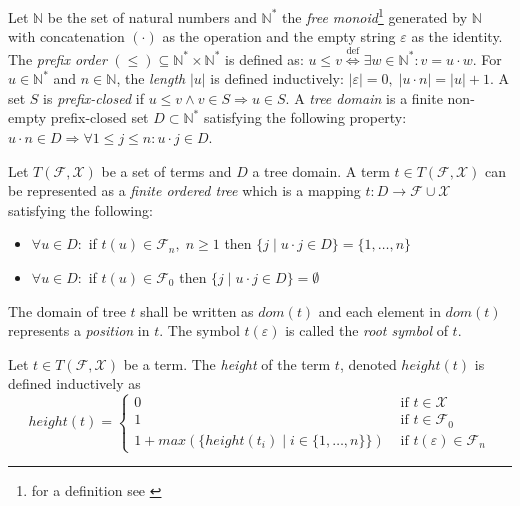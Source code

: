 \begin{defn}
Let $\mathbb{N}$ be the set of natural numbers and $\mathbb{N}^*$ the \emph{free monoid}\footnote{for a definition see \cite{Lothaire83}} generated by $\mathbb{N}$ with concatenation $(\cdot)$ as the operation and the empty string $\varepsilon$ as the identity. The \emph{prefix order} $(\leq) \subseteq \mathbb{N}^* \times \mathbb{N}^*$ is defined as: $u \leq v \overset{\text{def}}{\Longleftrightarrow} \exists w \in \mathbb{N}^*: v = u \cdot w$. For $u \in \mathbb{N}^*$ and $n \in \mathbb{N}$, the \emph{length} $|u|$ is defined inductively: $|\varepsilon| = 0, \; |u \cdot n| = |u| + 1$. A set $S$ is \emph{prefix-closed} if $u \leq v \wedge v \in S \Rightarrow u \in S$. A \emph{tree domain} is a finite non-empty prefix-closed set $D \subset \mathbb{N}^*$ satisfying the following property: $u \cdot n \in D \Rightarrow \forall 1 \leq j \leq n: u \cdot j \in D$.
\end{defn}

\begin{defn}
Let $T(\mathcal{F}, \mathcal{X})$ be a set of terms and $D$ a tree domain. A term $t \in T(\mathcal{F}, \mathcal{X})$ can be represented as a \emph{finite ordered tree} which is a mapping $t: D \rightarrow \mathcal{F} \cup \mathcal{X}$ satisfying the following:
\begin{itemize}
    \item $\forall u \in D:$ if $t(u) \in \mathcal{F}_n, \; n \geq 1$ then $\{j \; | \; u \cdot j \in D\} = \{1, \dots, n\}$
    \item $\forall u \in D:$ if $t(u) \in \mathcal{F}_0$ then $\{j \; | \; u \cdot j \in D\} = \emptyset$
\end{itemize}
The domain of tree $t$ shall be written as $dom(t)$ and each element in $dom(t)$ represents a \emph{position} in $t$. The symbol $t(\varepsilon)$ is called the \emph{root symbol} of $t$.
\end{defn}

\begin{defn}
Let $t \in T(\mathcal{F}, \mathcal{X})$ be a term. The \emph{height} of the term $t$, denoted $height(t)$ is defined inductively as
\begin{equation*}
    height(t) = 
    \begin{cases}
        0 & \text{ if } t \in \mathcal{X}\\
        1 & \text{ if } t \in \mathcal{F}_0\\
        1 + max(\{height(t_i) \; | \; i \in \{1, \dots, n\}\}) & \text{ if } t(\varepsilon) \in \mathcal{F}_n
    \end{cases}
\end{equation*}
\end{defn}

